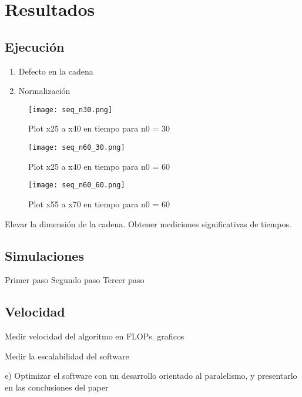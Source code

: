 \section{Resultados}

\subsection{Ejecución}

\begin{enumerate}
	\item Defecto en la cadena
	      	      	          
	\item Normalización
	      	      	          
\end{enumerate}

\begin{figure}
	\centering
	\texttt{[image: seq\_n30.png]}
	\caption{Plot x25 a x40 en tiempo para n0 = 30}
\end{figure}

\begin{figure}
	\centering
	\texttt{[image: seq\_n60\_30.png]}
	\caption{Plot x25 a x40 en tiempo para n0 = 60}
\end{figure}

\begin{figure}
	\centering
	\texttt{[image: seq\_n60\_60.png]}
	\caption{Plot x55 a x70 en tiempo para n0 = 60}
\end{figure}



Elevar la dimensión de la cadena. Obtener mediciones significativas de tiempos.

\subsection{Simulaciones}
Primer paso
Segundo paso
Tercer paso



	      	          


\subsection{Velocidad}

Medir velocidad del algoritmo en FLOPs. graficos

Medir la escalabilidad del software

e) Optimizar el software con un desarrollo orientado al paralelismo, y presentarlo
en las conclusiones del paper
